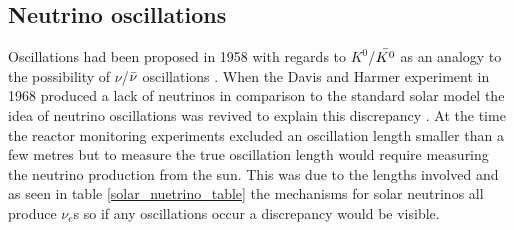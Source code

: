 
\subsection{Neutrino oscillations} \label{section_neutrino_oscillations}
Oscillations had been proposed in 1958 with regards to $K^0$/$\Bar{K^0}$ as an analogy to the possibility of $\nu$/$\Bar{\nu}$ oscillations \cite{griffiths2008book} \cite{griffiths2008neutrinoOscillations} \cite{pontecorvo1958_OscillationProposal}. When the Davis and Harmer experiment in 1968 produced a lack of neutrinos in comparison to the standard solar model the idea of neutrino oscillations was revived to explain this discrepancy \cite{pontecorvo_gibov_1969_solar_oscillation}. At the time the reactor monitoring experiments excluded an oscillation length smaller than a few metres but to measure the true oscillation length would require measuring the neutrino production from the sun. This was due to the lengths involved \cite{pontecorvo_gibov_1969_solar_oscillation} and as seen in table \ref{solar_nuetrino_table} the mechanisms for solar neutrinos all produce $\nu_e$s so if any oscillations occur a discrepancy would be visible. 
